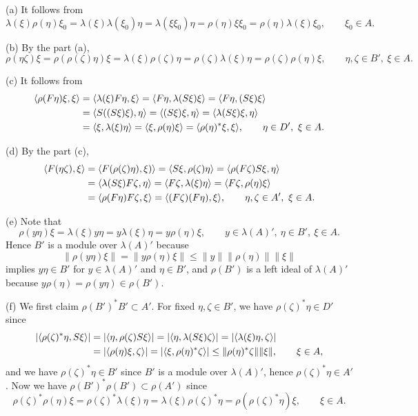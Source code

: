 \documentclass{../../small}
\begin{document}
\begin{pf}
(a)
It follows from
\[\lambda(\xi)\rho(\eta)\xi_0=\lambda(\xi)\lambda(\xi_0)\eta=\lambda(\xi\xi_0)\eta=\rho(\eta)\xi\xi_0=\rho(\eta)\lambda(\xi)\xi_0,\qquad\xi_0\in A.\]

(b)
By the part (a),
\[\rho(\eta\zeta)\xi=\rho(\rho(\zeta)\eta)\xi=\lambda(\xi)\rho(\zeta)\eta=\rho(\zeta)\lambda(\xi)\eta=\rho(\zeta)\rho(\eta)\xi,\qquad\eta,\zeta\in B',\ \xi\in A.\]

(c)
It follows from
\begin{align*}
\langle\rho(F\eta)\xi,\xi\rangle&=\langle\lambda(\xi)F\eta,\xi\rangle=\langle F\eta,\lambda(S\xi)\xi\rangle=\langle F\eta,(S\xi)\xi\rangle\\
&=\langle S((S\xi)\xi),\eta\rangle=\langle(S\xi)\xi,\eta\rangle=\langle\lambda(S\xi)\xi,\eta\rangle\\
&=\langle\xi,\lambda(\xi)\eta\rangle=\langle\xi,\rho(\eta)\xi\rangle=\langle\rho(\eta)^*\xi,\xi\rangle,\qquad\eta\in D',\ \xi\in A.
\end{align*}

(d)
By the part (c),
\begin{align*}
\langle F(\eta\zeta),\xi\rangle&=\langle F(\rho(\zeta)\eta),\xi)\rangle=\langle S\xi,\rho(\zeta)\eta\rangle=\langle\rho(F\zeta)S\xi,\eta\rangle\\
&=\langle\lambda(S\xi)F\zeta,\eta\rangle=\langle F\zeta,\lambda(\xi)\eta\rangle=\langle F\zeta,\rho(\eta)\xi\rangle\\
&=\langle\rho(F\eta)F\zeta,\xi\rangle=\langle(F\zeta)(F\eta),\xi\rangle,\qquad \eta,\zeta\in A',\ \xi\in A.
\end{align*}

(e) Note that
\[\rho(y\eta)\xi=\lambda(\xi)y\eta=y\lambda(\xi)\eta=y\rho(\eta)\xi,\qquad y\in\lambda(A)',\ \eta\in B',\ \xi\in A.\]
Hence $B'$ is a module over $\lambda(A)'$ because
\[\|\rho(y\eta)\xi\|=\|y\rho(\eta)\xi\|\le\|y\|\|\rho(\eta)\|\|\xi\|\]
implies $y\eta\in B'$ for $y\in \lambda(A)'$ and $\eta\in B'$, and $\rho(B')$ is a left ideal of $\lambda(A)'$ because $y\rho(\eta)=\rho(y\eta)\in\rho(B')$.

(f)
We first claim $\rho(B')^*B'\subset A'$.
For fixed $\eta,\zeta\in B'$, we have $\rho(\zeta)^*\eta\in D'$ since
\begin{align*}
|\langle\rho(\zeta)^*\eta,S\xi\rangle|&=|\langle\eta,\rho(\zeta)S\xi\rangle|=|\langle\eta,\lambda(S\xi)\zeta\rangle|=|\langle\lambda(\xi)\eta,\zeta\rangle|\\
&=|\langle\rho(\eta)\xi,\zeta\rangle|=|\langle\xi,\rho(\eta)^*\zeta\rangle|\le\|\rho(\eta)^*\zeta\|\|\xi\|,\qquad\xi\in A,
\end{align*}
and we have $\rho(\zeta)^*\eta\in B'$ since $B'$ is a module over $\lambda(A)'$, hence $\rho(\zeta)^*\eta\in A'$.
Now we have $\rho(B')^*\rho(B')\subset\rho(A')$ since
\[\rho(\zeta)^*\rho(\eta)\xi=\rho(\zeta)^*\lambda(\xi)\eta=\lambda(\xi)\rho(\zeta)^*\eta=\rho(\rho(\zeta)^*\eta)\xi,\qquad\xi\in A.\]



\end{pf}
\end{document}
